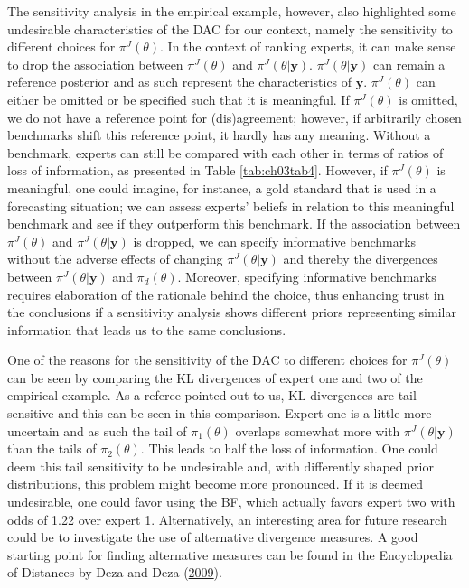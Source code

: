 \documentclass[openright,titlepage,12pt,a4paper]{book}
\begin{document}
The sensitivity analysis in the empirical example, however, also highlighted some undesirable characteristics of the DAC for our context, namely the sensitivity to different choices for \(\pi^J(\theta)\). In the context of ranking experts, it can make sense to drop the association between \(\pi^J(\theta)\) and \(\pi^J(\theta|\textbf{y})\). \(\pi^J(\theta|\textbf{y})\) can remain a reference posterior and as such represent the characteristics of \(\textbf{y}\). \(\pi^J(\theta)\) can either be omitted or be specified such that it is meaningful. If \(\pi^J(\theta)\) is omitted, we do not have a reference point for (dis)agreement; however, if arbitrarily chosen benchmarks shift this reference point, it hardly has any meaning. Without a benchmark, experts can still be compared with each other in terms of ratios of loss of information, as presented in Table \ref{tab:ch03tab4}. However, if \(\pi^J(\theta)\) is meaningful, one could imagine, for instance, a gold standard that is used in a forecasting situation; we can assess experts' beliefs in relation to this meaningful benchmark and see if they outperform this benchmark. If the association between \(\pi^J(\theta)\) and \(\pi^J(\theta|\textbf{y})\) is dropped, we can specify informative benchmarks without the adverse effects of changing \(\pi^J(\theta|\textbf{y})\) and thereby the divergences between \(\pi^J(\theta|\textbf{y})\) and \(\pi_d(\theta)\). Moreover, specifying informative benchmarks requires elaboration of the rationale behind the choice, thus enhancing trust in the conclusions if a sensitivity analysis shows different priors representing similar information that leads us to the same conclusions.

One of the reasons for the sensitivity of the DAC to different choices for \(\pi^J(\theta)\) can be seen by comparing the KL divergences of expert one and two of the empirical example. As a referee pointed out to us, KL divergences are tail sensitive and this can be seen in this comparison. Expert one is a little more uncertain and as such the tail of \(\pi_1(\theta)\) overlaps somewhat more with \(\pi^J(\theta|\textbf{y})\) than the tails of \(\pi_2(\theta)\). This leads to half the loss of information. One could deem this tail sensitivity to be undesirable and, with differently shaped prior distributions, this problem might become more pronounced. If it is deemed undesirable, one could favor using the BF, which actually favors expert two with odds of 1.22 over expert 1. Alternatively, an interesting area for future research could be to investigate the use of alternative divergence measures. A good starting point for finding alternative measures can be found in the Encyclopedia of Distances by Deza and Deza (\protect\hyperlink{ref-deza_encyclopedia_2009}{2009}).
\end{document}
